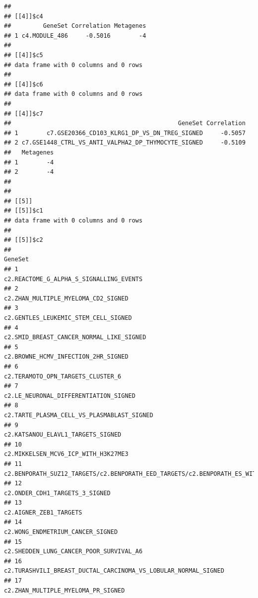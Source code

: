 \documentclass{article}\usepackage[]{graphicx}\usepackage[]{color}
\makeatletter
\newenvironment{kframe}{%
 \def\at@end@of@kframe{}%
 \ifinner\ifhmode%
  \def\at@end@of@kframe{\end{minipage}}%
  \begin{minipage}{\columnwidth}%
 \fi\fi%
 \def\FrameCommand##1{\hskip\@totalleftmargin \hskip-\fboxsep
 \colorbox{shadecolor}{##1}\hskip-\fboxsep
     \hskip-\linewidth \hskip-\@totalleftmargin \hskip\columnwidth}%
 \MakeFramed {\advance\hsize-\width
   \@totalleftmargin\z@ \linewidth\hsize
   \@setminipage}}%
 {\par\unskip\endMakeFramed%
 \at@end@of@kframe}
\newenvironment{knitrout}{}{} %
\makeatother
\begin{document}
\begin{knitrout}
\begin{kframe}
\begin{verbatim}
## 
## [[4]]$c4
##         GeneSet Correlation Metagenes
## 1 c4.MODULE_486     -0.5016        -4
## 
## [[4]]$c5
## data frame with 0 columns and 0 rows
## 
## [[4]]$c6
## data frame with 0 columns and 0 rows
## 
## [[4]]$c7
##                                               GeneSet Correlation
## 1        c7.GSE20366_CD103_KLRG1_DP_VS_DN_TREG_SIGNED     -0.5057
## 2 c7.GSE1448_CTRL_VS_ANTI_VALPHA2_DP_THYMOCYTE_SIGNED     -0.5109
##   Metagenes
## 1        -4
## 2        -4
## 
## 
## [[5]]
## [[5]]$c1
## data frame with 0 columns and 0 rows
## 
## [[5]]$c2
##                                                                                                        GeneSet
## 1                                                                      c2.REACTOME_G_ALPHA_S_SIGNALLING_EVENTS
## 2                                                                          c2.ZHAN_MULTIPLE_MYELOMA_CD2_SIGNED
## 3                                                                         c2.GENTLES_LEUKEMIC_STEM_CELL_SIGNED
## 4                                                                     c2.SMID_BREAST_CANCER_NORMAL_LIKE_SIGNED
## 5                                                                          c2.BROWNE_HCMV_INFECTION_2HR_SIGNED
## 6                                                                            c2.TERAMOTO_OPN_TARGETS_CLUSTER_6
## 7                                                                        c2.LE_NEURONAL_DIFFERENTIATION_SIGNED
## 8                                                                   c2.TARTE_PLASMA_CELL_VS_PLASMABLAST_SIGNED
## 9                                                                            c2.KATSANOU_ELAVL1_TARGETS_SIGNED
## 10                                                                         c2.MIKKELSEN_MCV6_ICP_WITH_H3K27ME3
## 11 c2.BENPORATH_SUZ12_TARGETS/c2.BENPORATH_EED_TARGETS/c2.BENPORATH_ES_WITH_H3K27ME3/c2.BENPORATH_PRC2_TARGETS
## 12                                                                              c2.ONDER_CDH1_TARGETS_3_SIGNED
## 13                                                                                      c2.AIGNER_ZEB1_TARGETS
## 14                                                                            c2.WONG_ENDMETRIUM_CANCER_SIGNED
## 15                                                                     c2.SHEDDEN_LUNG_CANCER_POOR_SURVIVAL_A6
## 16                                              c2.TURASHVILI_BREAST_DUCTAL_CARCINOMA_VS_LOBULAR_NORMAL_SIGNED
## 17                                                                          c2.ZHAN_MULTIPLE_MYELOMA_PR_SIGNED

\end{verbatim}
\end{kframe}
\end{knitrout}
\end{document}
